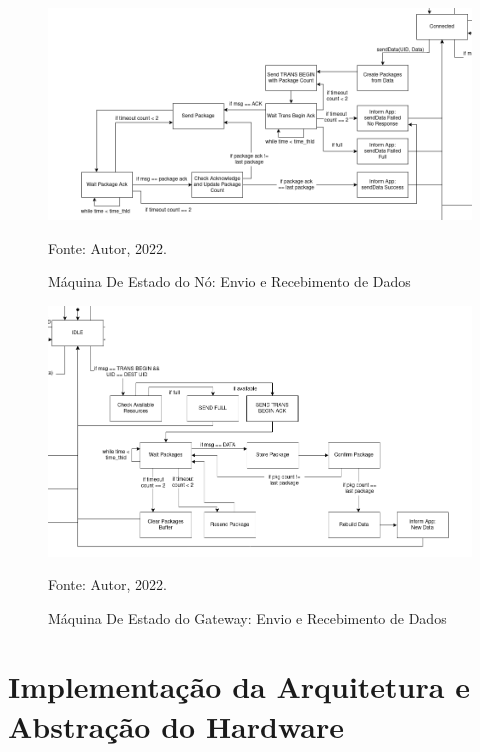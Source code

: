 \begin{figure}[htp]
    \centering
	\caption{Máquina De Estado do Nó: Envio e Recebimento de Dados}
    \includegraphics[height=0.27\textheight,keepaspectratio]{img/node-send.drawio.png}
    
    Fonte: Autor, 2022.
    \label{fig:fsm-node-send}
\end{figure}

\begin{figure}[htp]
    \centering
	\caption{Máquina De Estado do Gateway: Envio e Recebimento de Dados}
    \includegraphics[height=0.28\textheight,keepaspectratio]{img/gw-recv.drawio.png}
    
    Fonte: Autor, 2022.
    \label{fig:fsm-gw-recv}
\end{figure}

\clearpage

\section{Implementação da Arquitetura e Abstração do Hardware}

